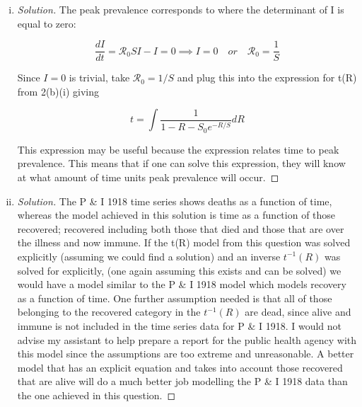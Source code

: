 \documentclass[12pt]{article}
\begin{document}
\begin{enumerate}[(a)]
\begin{enumerate}[(i)]
{\begin{proof}[Solution]
	We can solve this as a separable equation to  get the expression for t(R)
	
	\begin{equation}
	t=\int \frac{1}{1-R-S_0e^{-\mathcal{R}_0R}}dR
	\end{equation}
	
\end{proof}
}

 \item \basicSIRanalQbii

{\color{blue}
\begin{proof}[Solution]
	The peak prevalence corresponds to where the determinant of I is equal to zero:
	
	\begin{equation}
	\frac{dI}{dt}=\mathcal{R}_0 SI-I=0 \implies I=0 \quad or \quad  \mathcal{R}_0=\frac{1}{S}
	\end{equation}
	
	Since $I=0$ is trivial, take $\mathcal{R}_0=1/S$ and plug this into the expression for t(R) from 2(b)(i) giving 
	
	\begin{equation}
	t=\int \frac{1}{1-R-S_0e^{-R/S}}dR
	\end{equation}

	This expression may be useful because the expression relates time to peak prevalence. This means that if one can solve this expression, they will know at what amount of time units peak prevalence will occur.

\end{proof}
}

  \item \basicSIRanalQbiii
  
{\color{blue}
\begin{proof}[Solution]

	The P \& I 1918 time series shows deaths as a function of time, whereas the model achieved in this solution is time as a function of those recovered; recovered including both those that died and those that are over the illness and now immune. If the t(R) model from this question was solved explicitly (assuming we could find a solution) and an inverse $t^{-1}(R)$ was solved for explicitly, (one again assuming this exists and can be solved) we would have a model similar to the P \& I 1918 model which models recovery as a function of time. One further assumption needed is that all of those belonging to the recovered category in the $t^{-1}(R)$ are dead, since alive and immune is not included in the time series data for P \& I 1918. I would not advise my assistant to help prepare a report for the public health agency with this model since the assumptions are too extreme and unreasonable. A better model that has an explicit equation and takes into account those recovered that are alive will do a much better job modelling the P \& I 1918 data than the one achieved in this question.


\end{proof}}
\end{enumerate}
\end{enumerate}
\end{document}
